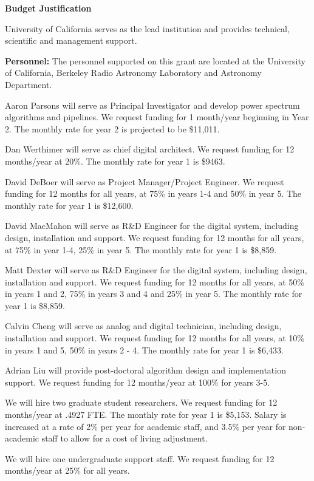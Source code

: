 \documentclass[onecolumn,11pt]{aastex}
\begin{document}
\begin{center}
{\bf \Large Budget Justification}
\end{center}

 University of California serves as the lead institution and provides technical, scientific and management support.

{\bf Personnel:} 
The personnel supported on this grant are located at the University of California, Berkeley Radio Astronomy Laboratory and Astronomy Department.

Aaron Parsons will serve as Principal Investigator and develop power spectrum algorithms and pipelines. We request funding for 1 month/year beginning in Year 2. The monthly rate for year 2 is projected to be \$11,011.

Dan Werthimer will serve as chief digital architect.  We request funding for 12 months/year at 20\%.  The monthly rate for year 1 is \$9463.

David DeBoer will serve as Project Manager/Project Engineer. We request funding for 12 months for all years, at 75\% in years 1-4 and 50\% in year 5. The monthly rate for year 1 is \$12,600.

David MacMahon will serve as R\&D Engineer for the digital system, including design, installation and support. We request funding for 12 months for all years, at 75\% in year 1-4, 25\% in year 5. The monthly rate for year 1 is \$8,859.

Matt Dexter will serve as R\&D Engineer for the digital system, including design, installation and support. We request funding for 12 months for all years, at 50\% in years 1 and 2, 75\% in years 3 and 4 and 25\% in year 5. The monthly rate for year 1 is \$8,859.

Calvin Cheng will serve as analog and digital technician, including design, installation and support. We request funding for 12 months for all years, at 10\% in years 1 and 5, 50\% in years 2 - 4. The monthly rate for year 1 is \$6,433.

Adrian Liu will provide post-doctoral algorithm design and implementation support.  We request funding for 12 months/year at 100\% for years 3-5.

We will hire two graduate student researchers. We request funding for 12 months/year at .4927 FTE. The monthly rate for year 1 is \$5,153.
Salary is increased at a rate of 2\% per year for academic staff, and 3.5\% per year for non-academic staff to allow for a cost of living adjustment.

We will hire one undergraduate support staff.  We request funding for 12 months/year at 25\% for all years.
\end{document}
